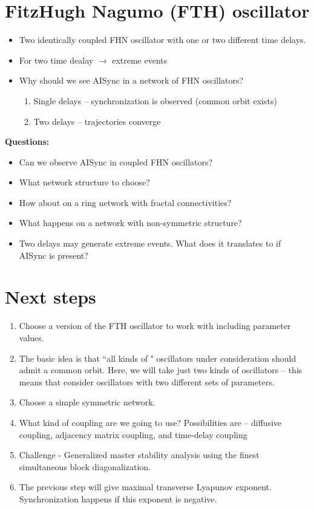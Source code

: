 \documentclass[paper=a4, fontsize=12pt]{scrartcl} %
\begin{document}
\section*{FitzHugh Nagumo (FTH) oscillator}
\begin{itemize}
    \item Two identically coupled FHN oscillator with one or two different 
    time delays.
    \item For two time dealay $\rightarrow$ extreme events
    \item Why should we see AISync in a network of FHN oscillators?
    \begin{enumerate}[label=(\alph*)]
    \item Single delays -- synchronization is observed (common orbit exists)
    \item Two delays -- trajectories converge
    \end{enumerate}
\end{itemize}

\textbf{Questions:}
\begin{itemize}
    \item Can we observe AISync in coupled FHN oscillators? 
    \item What network structure to choose?
    \item How about on a ring network with fractal connectivities?
    \item What happens on a network with non-symmetric structure? 
    \item Two delays may generate extreme events. What does it translates to 
    if AISync is present?
\end{itemize}

\section*{Next steps}
\begin{enumerate}
	\item Choose a version of the FTH oscillator to work with including parameter values. 
	\item The basic idea is that ``all kinds of " oscillators under consideration should admit a common orbit. Here, we will take just two kinds of oscillators -- this means that consider oscillators with two different sets of parameters. 
	\item Choose a simple symmetric network.
	\item What kind of coupling are we going to use? Possibilities are -- diffusive coupling, adjacency matrix coupling, and time-delay coupling  
	\item Challenge - Generalized master stability analysis using the finest simultaneous block diagonalization.
	\item The previous step will give maximal transverse Lyapunov exponent. Synchronization happens if this exponent is negative. 

\end{enumerate}
\end{document}
